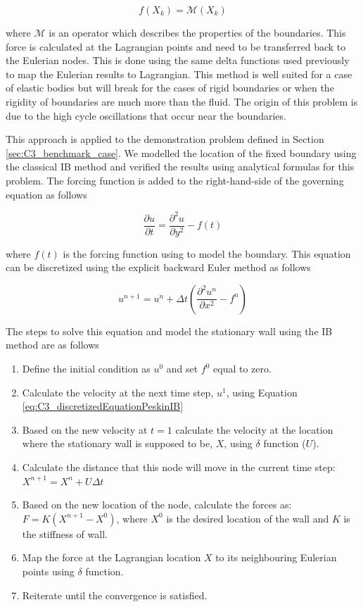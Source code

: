 \begin{equation}
	f(X_k) = \mathcal{M}(X_k)
\end{equation}

where $\mathcal{M}$ is an operator which describes the properties of the boundaries. This force is calculated at the Lagrangian points and need to be transferred back to the Eulerian nodes. This is done using the same delta functions used previously to map the Eulerian results to Lagrangian. This method is well suited for a case of elastic bodies but will break for the cases of rigid boundaries or when the rigidity of boundaries are much more than the fluid. The origin of this problem is due to the high cycle oscillations that occur near the boundaries.

This approach is applied to the demonstration problem defined in Section \ref{sec:C3_benchmark_case}. We modelled the location of the fixed boundary using the classical IB method and verified the results using analytical formulas for this problem. The forcing function is added to the right-hand-side of the governing equation as follows

\begin{equation}
	\frac{\partial u}{\partial t} = \frac{\partial^2 u}{\partial y^2} - f(t)
\end{equation}

where $f(t)$ is the forcing function using to model the boundary. This equation can be discretized using the explicit backward Euler method as follows

\begin{equation}\label{eq:C3_discretizedEquationPeskinIB}
	u^{n+1} = u^{n} + \Delta t \left( \frac{\partial^2 u^n}{\partial x^2} - f^n \right)
\end{equation}

The steps to solve this equation and model the stationary wall using the IB method are as follows

\begin{enumerate}
	\item Define the initial condition as $u^0$ and set $f^0$ equal to zero.
	\item Calculate the velocity at the next time step, $u^1$, using Equation \eqref{eq:C3_discretizedEquationPeskinIB}
	\item Based on the new velocity at $t=1$ calculate the velocity at the location where the stationary wall is supposed to be, $X$, using $\delta$ function ($U$).
	\item Calculate the distance that this node will move in the current time step: $X^{n+1} = X^n + U \Delta t$
	\item Based on the new location of the node, calculate the forces as: $F = K \left( X^{n+1} - X^0 \right)$, where $X^0$ is the desired location of the wall and $K$ is the stiffness of wall. 
	\item Map the force at the Lagrangian location $X$ to its neighbouring Eulerian points using $\delta$ function.
	\item Reiterate until the convergence is satisfied.
\end{enumerate}

